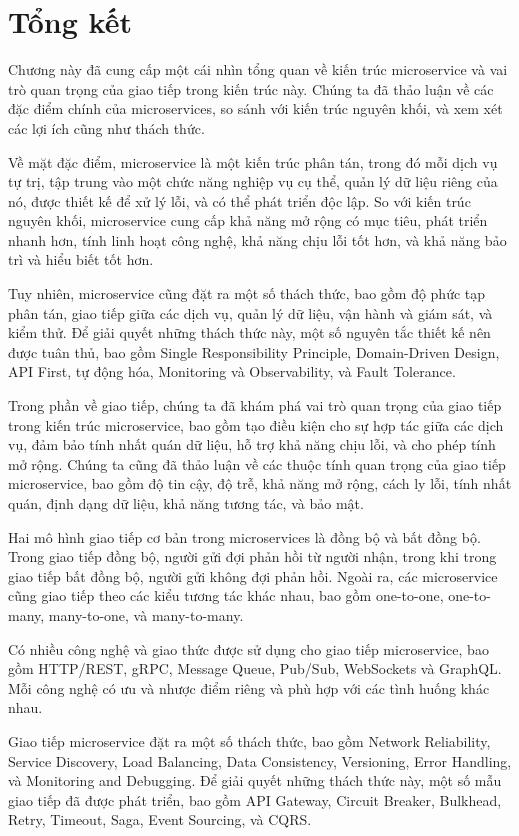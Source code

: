 \section{Tổng kết}

Chương này đã cung cấp một cái nhìn tổng quan về kiến trúc microservice và vai trò quan trọng của giao tiếp trong kiến trúc này. Chúng ta đã thảo luận về các đặc điểm chính của microservices, so sánh với kiến trúc nguyên khối, và xem xét các lợi ích cũng như thách thức.

Về mặt đặc điểm, microservice là một kiến trúc phân tán, trong đó mỗi dịch vụ tự trị, tập trung vào một chức năng nghiệp vụ cụ thể, quản lý dữ liệu riêng của nó, được thiết kế để xử lý lỗi, và có thể phát triển độc lập. So với kiến trúc nguyên khối, microservice cung cấp khả năng mở rộng có mục tiêu, phát triển nhanh hơn, tính linh hoạt công nghệ, khả năng chịu lỗi tốt hơn, và khả năng bảo trì và hiểu biết tốt hơn.

Tuy nhiên, microservice cũng đặt ra một số thách thức, bao gồm độ phức tạp phân tán, giao tiếp giữa các dịch vụ, quản lý dữ liệu, vận hành và giám sát, và kiểm thử. Để giải quyết những thách thức này, một số nguyên tắc thiết kế nên được tuân thủ, bao gồm Single Responsibility Principle, Domain-Driven Design, API First, tự động hóa, Monitoring và Observability, và Fault Tolerance.

Trong phần về giao tiếp, chúng ta đã khám phá vai trò quan trọng của giao tiếp trong kiến trúc microservice, bao gồm tạo điều kiện cho sự hợp tác giữa các dịch vụ, đảm bảo tính nhất quán dữ liệu, hỗ trợ khả năng chịu lỗi, và cho phép tính mở rộng. Chúng ta cũng đã thảo luận về các thuộc tính quan trọng của giao tiếp microservice, bao gồm độ tin cậy, độ trễ, khả năng mở rộng, cách ly lỗi, tính nhất quán, định dạng dữ liệu, khả năng tương tác, và bảo mật.

Hai mô hình giao tiếp cơ bản trong microservices là đồng bộ và bất đồng bộ. Trong giao tiếp đồng bộ, người gửi đợi phản hồi từ người nhận, trong khi trong giao tiếp bất đồng bộ, người gửi không đợi phản hồi. Ngoài ra, các microservice cũng giao tiếp theo các kiểu tương tác khác nhau, bao gồm one-to-one, one-to-many, many-to-one, và many-to-many.

Có nhiều công nghệ và giao thức được sử dụng cho giao tiếp microservice, bao gồm HTTP/REST, gRPC, Message Queue, Pub/Sub, WebSockets và GraphQL. Mỗi công nghệ có ưu và nhược điểm riêng và phù hợp với các tình huống khác nhau.

Giao tiếp microservice đặt ra một số thách thức, bao gồm Network Reliability, Service Discovery, Load Balancing, Data Consistency, Versioning, Error Handling, và Monitoring and Debugging. Để giải quyết những thách thức này, một số mẫu giao tiếp đã được phát triển, bao gồm API Gateway, Circuit Breaker, Bulkhead, Retry, Timeout, Saga, Event Sourcing, và CQRS.

